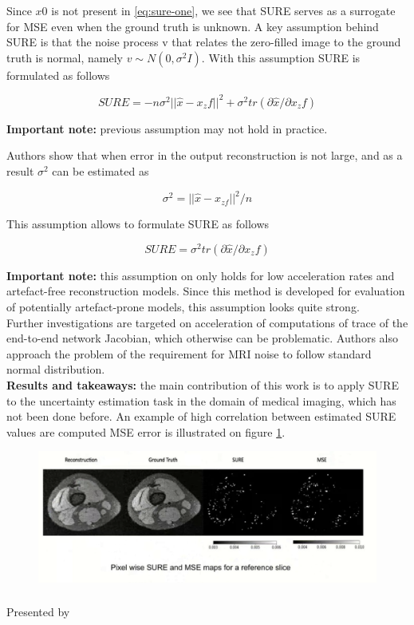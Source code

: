 Since $x0$ is not present in \ref{eq:sure-one}, we see that SURE serves as a surrogate for MSE even when the ground truth is unknown. 
A key assumption behind SURE is that the noise process v that relates the zero-filled image to the ground truth is normal, namely $v \sim N(0, \sigma^2
I)$. 
With this assumption SURE is formulated as follows 

\begin{equation}
    SURE = -n \sigma^2 || \hat{x} - x_zf ||^2 + \sigma^2 tr(\partial \hat{x} / \partial x_zf)
\end{equation}

\textbf{Important note:} previous assumption may not hold in practice. 

Authors show that when error in the output reconstruction is not large, and as a result $\sigma^2$ can be estimated as 

\begin{equation}
    \sigma^2 = || \hat{x} - x_{zf} ||^2  / n
\end{equation} 

This assumption allows to formulate SURE as follows 

\begin{equation}
    SURE = \sigma^2 tr(\partial \hat{x} / \partial x_zf)
\end{equation} 

\textbf{Important note:} this assumption on only holds for low acceleration rates and artefact-free reconstruction models. 
Since this method is developed for evaluation of potentially artefact-prone models, this assumption looks quite strong. \\

Further investigations are targeted on acceleration of computations of trace of the end-to-end network Jacobian, which otherwise can be problematic. 
Authors also approach the problem of the requirement for MRI noise to follow standard normal distribution. \\

{\bf Results and takeaways:} the main contribution of this work is to apply SURE to the uncertainty estimation task in the domain of medical imaging, which has not been done before. 
An example of high correlation between estimated SURE values are computed MSE error is illustrated on figure \ref{fig:sure-result}.

\begin{figure}[h!]
    \centering
    \includegraphics[scale=0.4]{neurips-2020/images/Screenshot 2020-12-12 at 17.26.28.png}
    \label{fig:sure-result}
\end{figure}





\subsubsection{ \cite{}}

Presented by \textit{} \\
